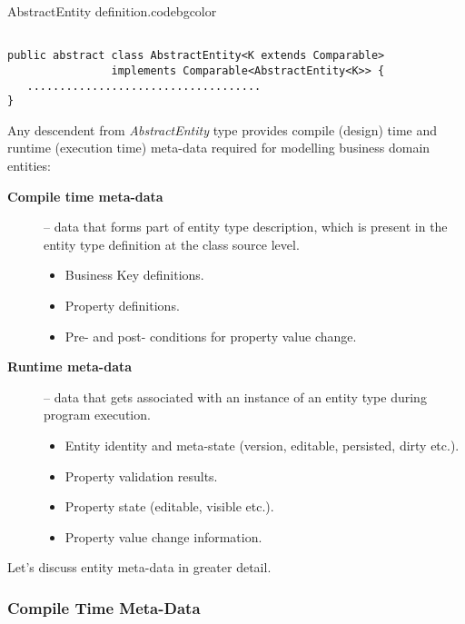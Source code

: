   \begin{code}{AbstractEntity definition.}{\label{lst:AbstractEntity}}{codebgcolor}
    \begin{lstlisting}

public abstract class AbstractEntity<K extends Comparable> 
                implements Comparable<AbstractEntity<K>> {
   ....................................
}
    \end{lstlisting}
  \end{code}


  Any descendent from \emph{AbstractEntity} type provides compile (design) time and runtime (execution time) meta-data required for modelling business domain entities:
  \begin{description}
   \item[\textbf{Compile time meta-data}] -- data that forms part of entity type description, which is present in the entity type definition at the class source level.
      \begin{itemize}
	\item Business Key definitions.
	\item Property definitions.
	\item Pre- and post- conditions for property value change.
      \end{itemize}

   \item[\textbf{Runtime meta-data}] -- data that gets associated with an instance of an entity type during program execution.
      \begin{itemize}
	\item Entity identity and meta-state (version, editable, persisted, dirty etc.).
	\item Property validation results.
	\item Property state (editable, visible etc.).	
	\item Property value change information.	
      \end{itemize}
   \end{description}

  Let's discuss entity meta-data in greater detail.

\subsubsection{Compile Time Meta-Data}
  
